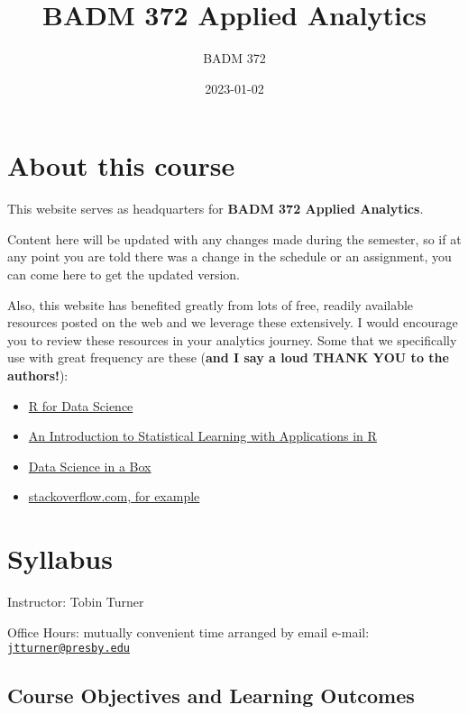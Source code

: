 \documentclass[
]{book}
\title{BADM 372 Applied Analytics}
\author{BADM 372}
\date{2023-01-02}
\providecommand{\tightlist}{%
  \setlength{\itemsep}{0pt}\setlength{\parskip}{0pt}}
\begin{document}
\maketitle

{
\setcounter{tocdepth}{1}
\tableofcontents
}
\hypertarget{about-this-course}{%
\chapter{About this course}\label{about-this-course}}

This website serves as headquarters for \textbf{BADM 372 Applied Analytics}.

Content here will be updated with any changes made during the semester, so if at any point you are told there was a change in the schedule or an assignment, you can come here to get the updated version.

Also, this website has benefited greatly from lots of free, readily available resources posted on the web and we leverage these extensively. I would encourage you to review these resources in your analytics journey. Some that we specifically use with great frequency are these (\textbf{and I say a loud THANK YOU to the authors!}):

\begin{itemize}
\tightlist
\item
  \href{https://r4ds.had.co.nz/}{R for Data Science}
\item
  \href{https://trevorhastie.github.io/ISLR/}{An Introduction to Statistical Learning with Applications in R}
\item
  \href{https://datasciencebox.org/}{Data Science in a Box}
\item
  \href{https://stackoverflow.com/questions/4862178/remove-rows-with-all-or-some-nas-missing-values-in-data-frame?rq=1}{stackoverflow.com, for example}
\end{itemize}

\hypertarget{syllabus}{%
\chapter{Syllabus}\label{syllabus}}

Instructor: Tobin Turner

Office Hours: mutually convenient time arranged by email e-mail: \href{mailto:jtturner@presby.edu}{\nolinkurl{jtturner@presby.edu}}

\hypertarget{course-objectives-and-learning-outcomes}{%
\section{Course Objectives and Learning Outcomes}\label{course-objectives-and-learning-outcomes}}
\end{document}

